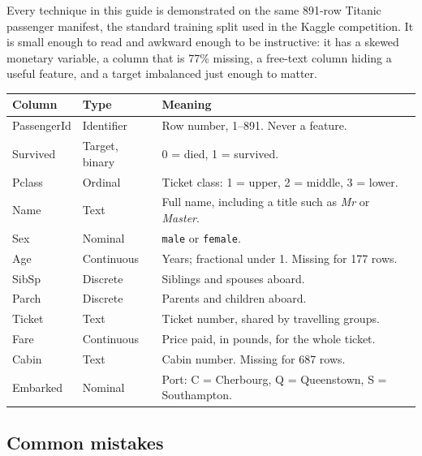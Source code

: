 \documentclass[11pt,a4paper]{article}
\begin{document}
Every technique in this guide is demonstrated on the same 891-row Titanic passenger
manifest, the standard training split used in the Kaggle competition. It is small enough to
read and awkward enough to be instructive: it has a skewed monetary variable, a column that
is 77\% missing, a free-text column hiding a useful feature, and a target imbalanced just
enough to matter.

\begin{tabularx}{\textwidth}{@{}>{\ttfamily}l l X@{}}
\toprule
\rowcolor{tablehead} \textrm{\bfseries Column} & \textbf{Type} & \textbf{Meaning} \\
\midrule
PassengerId & Identifier & Row number, 1--891. Never a feature. \\
Survived & Target, binary & 0 = died, 1 = survived. \\
Pclass & Ordinal & Ticket class: 1 = upper, 2 = middle, 3 = lower. \\
Name & Text & Full name, including a title such as \emph{Mr} or \emph{Master}. \\
Sex & Nominal & \texttt{male} or \texttt{female}. \\
Age & Continuous & Years; fractional under 1. Missing for 177 rows. \\
SibSp & Discrete & Siblings and spouses aboard. \\
Parch & Discrete & Parents and children aboard. \\
Ticket & Text & Ticket number, shared by travelling groups. \\
Fare & Continuous & Price paid, in pounds, for the whole ticket. \\
Cabin & Text & Cabin number. Missing for 687 rows. \\
Embarked & Nominal & Port: C = Cherbourg, Q = Queenstown, S = Southampton. \\
\bottomrule
\end{tabularx}


\subsection*{Common mistakes}
\end{document}
